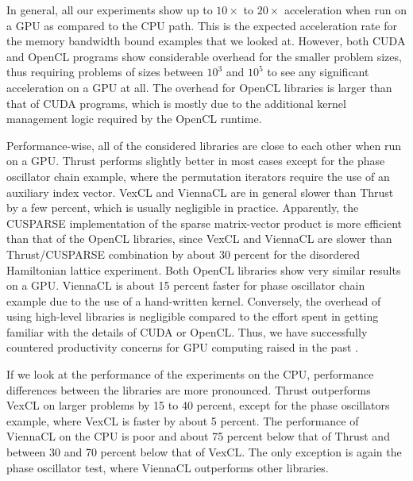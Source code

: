 \documentclass[final]{siamltex}
\begin{document}
In general, all our experiments show up to $10\times$ to $20\times$ acceleration
when run on a GPU as compared to the CPU path. This is the expected acceleration
rate for the memory bandwidth bound examples that we looked at. However, both CUDA and OpenCL
programs show considerable overhead for the smaller problem sizes,
thus requiring problems of sizes between $10^3$ and $10^5$ to see any significant acceleration on
a GPU at all. The overhead for OpenCL libraries is larger than that of CUDA programs,
which is mostly due to the additional kernel management logic required by the OpenCL runtime.

Performance-wise, all of the considered libraries are close to each other when
run on a GPU.  Thrust performs slightly better in most cases except for the phase oscillator chain example,
where the permutation iterators require the use of an auxiliary index vector.
VexCL and ViennaCL are in general slower than Thrust by a few percent, which is usually negligible in practice.
Apparently, the CUSPARSE implementation of the sparse matrix-vector product is more efficient than that of the OpenCL
libraries, since VexCL and ViennaCL are slower than Thrust/CUSPARSE combination
by about 30 percent for the disordered Hamiltonian lattice experiment. Both
OpenCL libraries show very similar results on a GPU. ViennaCL is about 15 percent faster for
phase oscillator chain example due to the use of a hand-written kernel.
Conversely, the overhead of using high-level libraries is negligible compared to the effort spent in getting familiar with the details of CUDA or OpenCL.
Thus, we have successfully countered productivity concerns for GPU computing raised in the past \cite{bordawekar:gpu-productivity}.

If we look at the performance of the experiments on the CPU, performance
differences between the libraries are more pronounced. Thrust outperforms
VexCL on larger problems by 15 to 40 percent, except for the phase
oscillators example, where VexCL is faster by about 5 percent.
The performance of ViennaCL on the CPU is poor and about 75 percent below that of Thrust and between 30 and 70 percent below that of VexCL.
The only exception is again the phase oscillator test, where ViennaCL outperforms other libraries.
\end{document}
